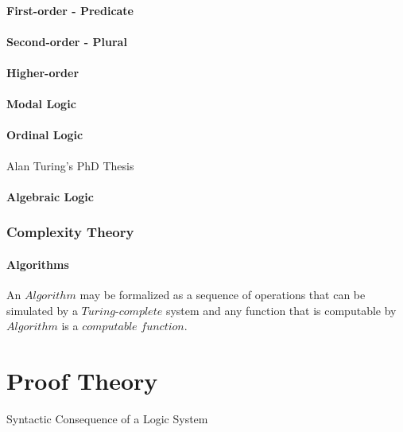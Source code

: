 \documentclass{article}
\begin{document}
\subsection{First-order - Predicate}

\subsection{Second-order - Plural}

\subsection{Higher-order}

\subsection{Modal Logic}

\subsection{Ordinal Logic}

Alan Turing's PhD Thesis \cite{turing38}

\subsection{Algebraic Logic}


\section{Complexity Theory}

\subsection{Algorithms}

An $Algorithm$ may be formalized as a sequence of operations that
can be simulated by a $Turing$-$complete$ system and any function
that is computable by $Algorithm$ is a $computable$ $function$.

\part{Proof Theory}

Syntactic Consequence of a Logic System
\end{document}
